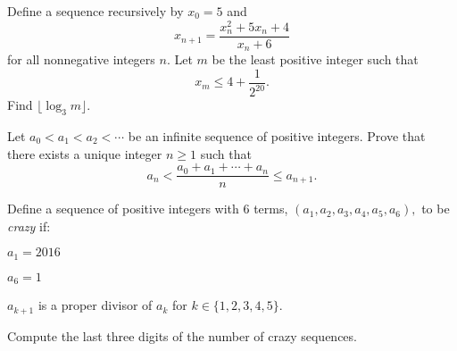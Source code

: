 \documentclass{article}
\begin{document}
\begin{prob}[AMC 12B 2019/22]{9}
Define a sequence recursively by $x_0=5$ and \[x_{n+1}=\frac{x_n^2+5x_n+4}{x_n+6}\] for all nonnegative integers $n.$ Let $m$ be the least positive integer such that \[x_m\leq 4+\frac{1}{2^{20}}.\] Find $\lfloor \log_3m\rfloor.$
\end{prob}


\begin{prob}[IMO 2014/1]{13}
Let $a_0<a_1<a_2<\cdots$ be an infinite sequence of positive integers. Prove that there exists a unique integer $n\ge1$ such that
\[a_n<\frac{a_0+a_1+\cdots + a_n}{n}\le a_{n+1}.\]
\end{prob}

\begin{prob}[rd123 AIME 2020/12]{13}
Define a sequence of positive integers with $6$ terms, $(a_1,a_2,a_3,a_4,a_5,a_6),$ to be \textit{crazy} if:
	\begin{itemize}
		\Item $a_1=2016$
        
		\Item $a_6=1$
        
		\Item $a_{k+1}$ is a proper divisor of $a_k$ for $k\in \{1,2,3,4,5\}.$
	\end{itemize}
Compute the last three digits of the number of crazy sequences.
\end{prob}
\end{document}
